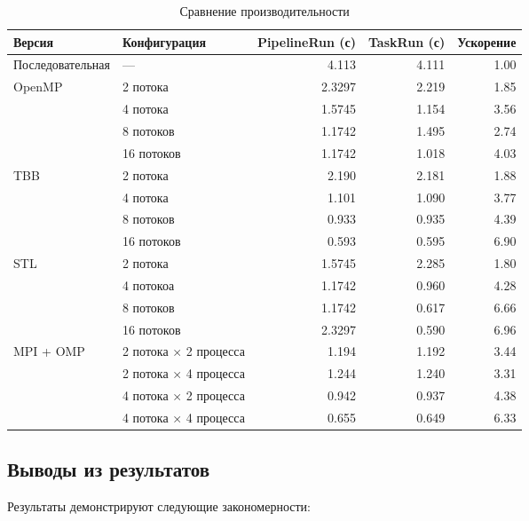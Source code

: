\documentclass[a4paper,12pt]{article}
\begin{document}
\begin{table}[H]
\centering
\footnotesize
\renewcommand{\arraystretch}{1.2}
\setlength{\tabcolsep}{4pt}
\begin{tabularx}{0.95\textwidth}{@{}l>{\raggedright}Xrrr@{}}
\toprule
\textbf{Версия} & \textbf{Конфигурация} & \textbf{PipelineRun (с)} & \textbf{TaskRun (с)} & \textbf{Ускорение} \\ 
\midrule
Последовательная & — & 4.113 & 4.111 & 1.00 \\
\midrule

OpenMP 
  & 2 потока & 2.3297 & 2.219 & 1.85 \\
  & 4 потока & 1.5745 & 1.154 & 3.56 \\
  & 8 потоков & 1.1742 & 1.495 & 2.74 \\
  & 16 потоков & 1.1742 & 1.018 & 4.03 \\
\midrule

TBB 
  & 2 потока & 2.190 & 2.181 & 1.88 \\
  & 4 потока & 1.101 & 1.090 & 3.77 \\
  & 8 потоков & 0.933 & 0.935 & 4.39 \\
  & 16 потоков & 0.593 & 0.595 & 6.90 \\
\midrule

STL
  & 2 потока & 1.5745 & 2.285 & 1.80 \\
  & 4 потокоа & 1.1742 & 0.960 & 4.28 \\
  & 8 потоков & 1.1742 & 0.617 & 6.66 \\
  & 16 потоков & 2.3297 & 0.590 & 6.96 \\
\midrule

MPI + OMP 
  & 2 потока × 2 процесса & 1.194 & 1.192 & 3.44 \\
  & 2 потока × 4 процесса & 1.244 & 1.240 & 3.31 \\
  & 4 потока × 2 процесса & 0.942 & 0.937 & 4.38 \\
  & 4 потока × 4 процесса & 0.655 & 0.649 & 6.33 \\
\bottomrule

\end{tabularx}
\caption{Сравнение производительности}
\label{table:benchmark}
\end{table}

\subsection{Выводы из результатов}

Результаты демонстрируют следующие закономерности: \\
\end{document}
